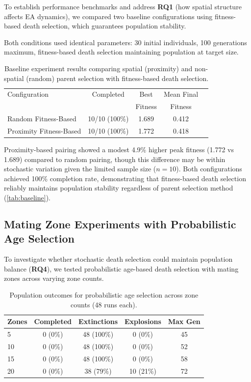 \documentclass[dvipsnames,format=sigconf,anonymous=false,review=false]{acmart}
\begin{document}
To establish performance benchmarks and address \textbf{RQ1} (how spatial structure affects EA dynamics), we compared two baseline configurations using fitness-based death selection, which guarantees population stability.

Both conditions used identical parameters: 30 initial individuals, 100 generations maximum, fitness-based death selection maintaining population at target size.

\begin{table}[h!]
\centering
\begin{tabular}{@{}lcccc@{}}
\toprule
Configuration & Completed & Best & Mean Final \\
 &  & Fitness & Fitness \\
\midrule
Random Fitness-Based & 10/10 (100\%) & 1.689 & 0.412 \\
Proximity Fitness-Based & 10/10 (100\%) & 1.772 & 0.418 \\
\bottomrule
\end{tabular}
\caption{Baseline experiment results comparing spatial (proximity) and non-spatial (random) parent selection with fitness-based death selection.}
\label{tab:baseline}
\end{table}

Proximity-based pairing showed a modest 4.9\% higher peak fitness (1.772 vs 1.689) compared to random pairing, though this difference may be within stochastic variation given the limited sample size ($n=10$). Both configurations achieved 100\% completion rate, demonstrating that fitness-based death selection reliably maintains population stability regardless of parent selection method (\autoref{tab:baseline}).

\subsection{Mating Zone Experiments with Probabilistic Age Selection}

To investigate whether stochastic death selection could maintain population balance (\textbf{RQ4}), we tested probabilistic age-based death selection with mating zones across varying zone counts.

\begin{table}[h!]
\centering

\begin{tabular}{@{}lcccc@{}}
\toprule
Zones & Completed & Extinctions & Explosions & Max Gen \\
\midrule
5 & 0 (0\%) & 48 (100\%) & 0 (0\%) & 45 \\
10 & 0 (0\%) & 48 (100\%) & 0 (0\%) & 52 \\
15 & 0 (0\%) & 48 (100\%) & 0 (0\%) & 58 \\
20 & 0 (0\%) & 38 (79\%) & 10 (21\%) & 72 \\
\bottomrule
\end{tabular}
\caption{Population outcomes for probabilistic age selection across zone counts (48 runs each).}
\label{tab:probage}
\end{table}
\end{document}
